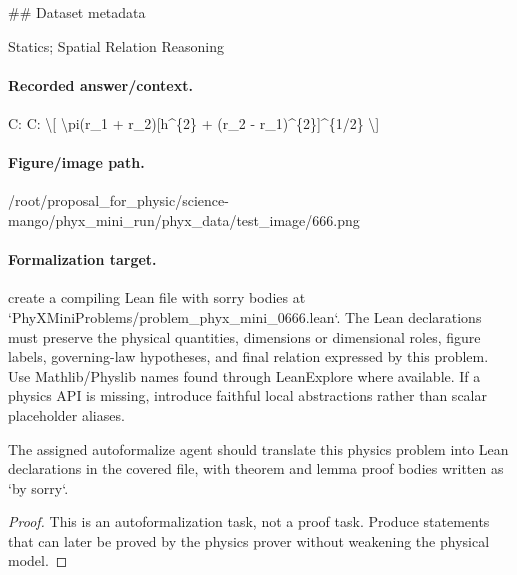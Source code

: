 \#\# Dataset metadata

Statics; Spatial Relation Reasoning

\paragraph{Recorded answer/context.}
C: C: \textbackslash{}[ \textbackslash{}pi(r\_1 + r\_2)[h\textasciicircum{}\{2\} + (r\_2 - r\_1)\textasciicircum{}\{2\}]\textasciicircum{}\{1/2\} \textbackslash{}]

\paragraph{Figure/image path.}
/root/proposal\_for\_physic/science-mango/phyx\_mini\_run/phyx\_data/test\_image/666.png

\paragraph{Formalization target.}
create a compiling Lean file with sorry bodies at `PhyXMiniProblems/problem\_phyx\_mini\_0666.lean`. The Lean declarations must preserve the physical quantities, dimensions or dimensional roles, figure labels, governing-law hypotheses, and final relation expressed by this problem.
Use Mathlib/Physlib names found through LeanExplore where available. If a physics API is missing, introduce faithful local abstractions rather than scalar placeholder aliases.

\begin{theorem}
\label{thm:physics:phyx_mini_0666:target}
The assigned autoformalize agent should translate this physics problem into Lean declarations in the covered file, with theorem and lemma proof bodies written as `by sorry`.
\end{theorem}
\begin{proof}
This is an autoformalization task, not a proof task. Produce statements that can later be proved by the physics prover without weakening the physical model.
\end{proof}

